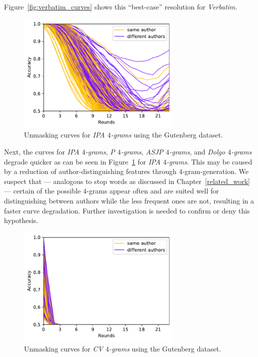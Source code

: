 Figure~\ref{fig:verbatim_curves} shows this ``best-case'' resolution for \textit{Verbatim}.
\begin{figure}
  \centering
  \includegraphics[width=0.7\textwidth]{figures/ipa_4grams_curves}
  \caption{Unmasking curves for \textit{IPA $4$-grams} using the Gutenberg dataset.}
  \label{fig:ipa_4grams_curves}
\end{figure}
Next, the curves for \textit{IPA $4$-grams}, \textit{P $4$-grams}, \textit{ASJP $4$-grams}, and \textit{Dolgo $4$-grams} degrade quicker as can be seen in Figure~\ref{fig:ipa_4grams_curves} for \textit{IPA $4$-grams}.
This may be caused by a reduction of author-distinguishing features through $4$-gram-generation.
We suspect that --- analogous to stop words as discussed in Chapter~\ref{related_work} --- certain of the possible $4$-grams appear often and are suited well for distinguishing between authors while the less frequent ones are not, resulting in a faster curve degradation.
Further investigation is needed to confirm or deny this hypothesis.
\begin{figure}
  \centering
  \includegraphics[width=0.7\textwidth]{figures/cv_4grams_curves}
  \caption{Unmasking curves for \textit{CV $4$-grams} using the Gutenberg dataset.}
  \label{fig:cv_4grams_curves}
\end{figure}
